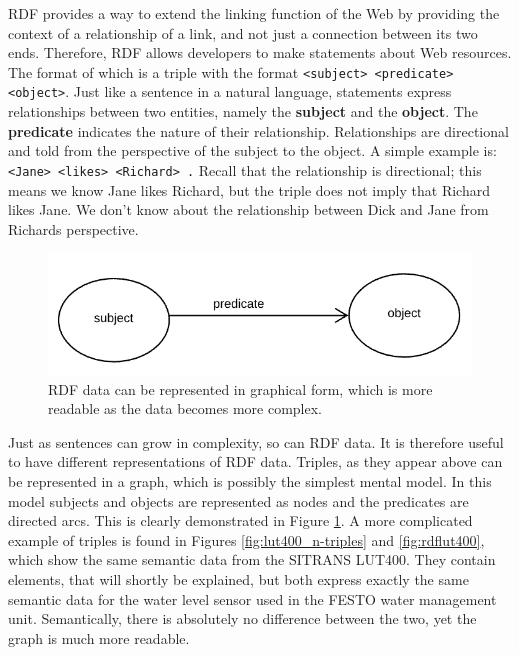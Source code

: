 RDF provides a way to extend the linking function of the Web by providing the context of a relationship of a link, and not just a connection between its two ends. Therefore, RDF allows developers to make statements about Web resources. The format of which is a triple with the format \texttt{<subject> <predicate> <object>}. Just like a sentence in a natural language, statements express relationships between two entities, namely the \textbf{subject} and the \textbf{object}. The \textbf{predicate} indicates the nature of their relationship. Relationships are directional and told from the perspective of the subject to the object. A simple example is: \texttt{<Jane> <likes> <Richard> .} Recall that the relationship is directional; this means we know Jane likes Richard, but the triple does not imply that Richard likes Jane. We don’t know about the relationship between Dick and Jane from Richards perspective.

\begin{figure}[th]
\centering
\includegraphics[width=.7\textwidth]{Figures/RDFspo.png}
\caption{RDF data can be represented in graphical form, which is more readable as the data becomes more complex.}
\label{fig:RDFspo}
\end{figure}

Just as sentences can grow in complexity, so can RDF data. It is therefore useful to have different representations of RDF data. Triples, as they appear above can be represented in a graph, which is possibly the simplest mental model. In this model subjects and objects are represented as nodes and the predicates are directed arcs. This is clearly demonstrated in Figure \ref{fig:RDFspo}. A more complicated example of triples is found in Figures \ref{fig:lut400_n-triples} and \ref{fig:rdflut400}, which show the same semantic data from the SITRANS LUT400. They contain elements, that will shortly be explained, but both express exactly the same semantic data for the water level sensor used in the FESTO water management unit. Semantically, there is absolutely no difference between the two, yet the graph is much more readable.


